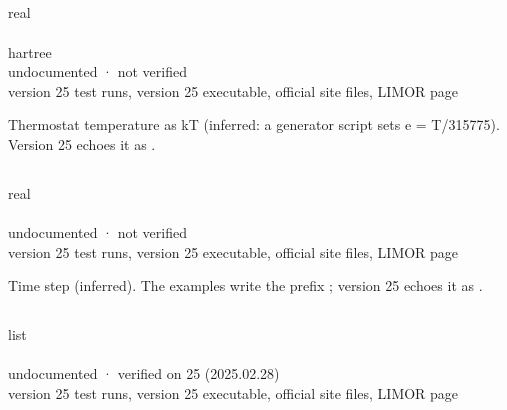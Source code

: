 \documentclass[letterpaper,10pt,english,openany,oneside]{sphinxmanual}
\begin{document}
\subsection{}
\label{\detokenize{reference/dynamic:e}}\label{\detokenize{reference/dynamic:dynamic-e}}
\ignorespaces 
\sphinxAtStartPar
{} real\\
 \\
 hartree\\
 undocumented · not verified\\
 version 25 test runs, version 25 executable, official site files, LIMOR page

\sphinxAtStartPar
Thermostat temperature as kT (inferred: a generator script sets e = T/315775). Version 25 echoes it as .


\subsection{}
\label{\detokenize{reference/dynamic:dx}}\label{\detokenize{reference/dynamic:dynamic-dx}}
\ignorespaces 
\sphinxAtStartPar
{} real\\
 \\
 undocumented · not verified\\
 version 25 test runs, version 25 executable, official site files, LIMOR page

\sphinxAtStartPar
Time step (inferred). The examples write the prefix ; version 25 echoes it as .


\subsection{}
\label{\detokenize{reference/dynamic:n}}\label{\detokenize{reference/dynamic:dynamic-n}}
\ignorespaces 
\sphinxAtStartPar
{} list\\
 \\
 undocumented · verified on 25 (2025.02.28)\\
 version 25 test runs, version 25 executable, official site files, LIMOR page
\end{document}
